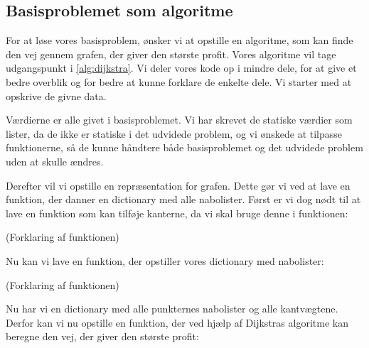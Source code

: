 \subsection{Basisproblemet som algoritme}
For at løse vores basisproblem, ønsker vi at opstille en algoritme, som kan finde den vej gennem grafen, der giver den største profit. Vores algoritme vil tage udgangspunkt i \autoref{alg:dijkstra}. Vi deler vores kode op i mindre dele, for at give et bedre overblik og for bedre at kunne forklare de enkelte dele. Vi starter med at opskrive de givne data. 



Værdierne er alle givet i basisproblemet. Vi har skrevet de statiske værdier som lister, da de ikke er statiske i det udvidede problem, og vi ønskede at tilpasse funktionerne, så de kunne håndtere både basisproblemet og det udvidede problem uden at skulle ændres. 

Derefter vil vi opstille en repræsentation for grafen. Dette gør vi ved at lave en funktion, der danner en dictionary med alle nabolister. Først er vi dog nødt til at lave en funktion som kan tilføje kanterne, da vi skal bruge denne i funktionen:



(Forklaring af funktionen)

Nu kan vi lave en funktion, der opstiller vores dictionary med nabolister:



(Forklaring af funktionen)

Nu har vi en dictionary med alle punkternes nabolister og alle kantvægtene. Derfor kan vi nu opstille en funktion, der ved hjælp af Dijkstras algoritme kan beregne den vej, der giver den største profit:



